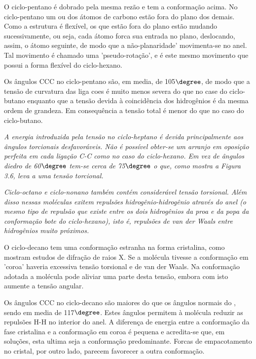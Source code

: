 O ciclo-pentano é dobrado pela mesma rezão e tem a conformação acima. No ciclo-pentano um ou dos átomos de carbono estão fora do plano dos demais. Como a estrutura é flexível, os que estão fora do plano estão mudando sucessivamente, ou seja, cada átomo forca sua entrada no plano, deslocando, assim, o átomo seguinte, de modo que a não-planaridade' movimenta-se no anel. Tal movimento é chamado uma 'pseudo-rotação', e é este mesmo movimento que possui a forma flexível do ciclo-hexano.

Os ângulos CCC no ciclo-pentano são, em media, de 105$\degree$, de modo que a tensão de curvatura das liga coes é muito menos severa do que no case do ciclo-butano enquanto que a tensão devida à coincidência dos hidrogênios é da mesma ordem de grandeza. Em consequência a tensão total é menor do que no caso do ciclo-butano.

\begin{figure}[H]
    \centering
    \qquad
\end{figure}

\noindent\emph{A energia introduzida pela tensão no ciclo-heptano é devida principalmente aos ângulos torcionais desfavoráveis. Não é possível obter-se um arranjo em oposição perfeita em cada ligação C-C como no caso do ciclo-hexano. Em vez de ângulos diedro de 60$\degree$ tem-se cerca de 75$\degree$ o que, como mostra a Figura 3.6, leva a uma tensão torcional.}

\emph{Ciclo-octano e ciclo-nonano também contém considerável tensão torsional. Além disso nessas moléculas exitem repulsões hidrogênio-hidrogênio através do anel (o mesmo tipo de repulsão que existe entre os dois hidrogênios da proa e da popa da conformação bote do ciclo-hexano), isto é, repulsões de van der Waals entre hidrogênios muito próximos.}

O ciclo-decano tem uma conformação estranha na forma cristalina, como mostram estudos de difração de raios X. Se a molécula tivesse a conformação em 'coroa' haveria excessiva tensão torsional e de van der Waals. Na conformação adotada a molécula pode aliviar uma parte desta tensão, embora com isto aumente a tensão angular.

Os ângulos CCC no ciclo-decano são maiores do que os ângulos normais do , sendo em media de 117$\degree$. Estes ângulos permitem à molécula reduzir as repulsões H-H no interior do anel. A diferença de energia entre a conformação da fase cristalina e a conformação em coroa é pequena e acredita-se que, em soluções, esta ultima seja a conformação predominante. Forcas de empacotamento no cristal, por outro lado, parecem favorecer a outra conformação.

